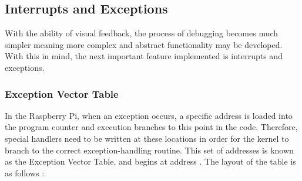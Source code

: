\subsection{Interrupts and Exceptions}
    With the ability of visual feedback, the process of debugging becomes much
    simpler meaning more complex and abstract functionality may be developed.
    With this in mind, the next important feature implemented is interrupts and
    exceptions.

    \subsubsection{Exception Vector Table}
        In the Raspberry Pi, when an exception occurs, a specific address is
        loaded into the program counter and execution branches to this point in
        the code. Therefore, special handlers need to be written at these
        locations in order for the kernel to branch to the correct
        exception-handling routine. This set of addresses is known as the
        Exception Vector Table, and begins at address . The layout of
        the table is as follows \cite[pg.~A2-16]{ARMARM}:
